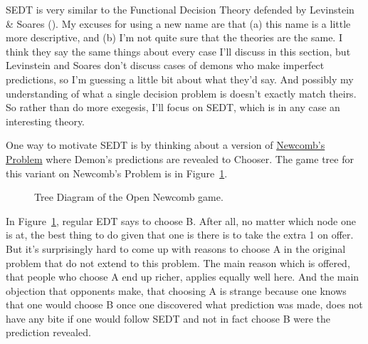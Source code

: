 \documentclass[
  12pt,
  letterpaper,
  DIV=11,
  numbers=noendperiod]{scrreprt}
\begin{document}
SEDT is very similar to the Functional Decision Theory defended by
Levinstein \& Soares (). My
excuses for using a new name are that (a) this name is a little more
descriptive, and (b) I'm not quite sure that the theories are the same.
I think they say the same things about every case I'll discuss in this
section, but Levinstein and Soares don't discuss cases of demons who
make imperfect predictions, so I'm guessing a little bit about what
they'd say. And possibly my understanding of what a single decision
problem is doesn't exactly match theirs. So rather than do more
exegesis, I'll focus on SEDT, which is in any case an interesting
theory.

One way to motivate SEDT is by thinking about a version of
\hyperref[tbl-newcomb]{Newcomb's Problem} where Demon's predictions are
revealed to Chooser. The game tree for this variant on Newcomb's Problem
is in Figure~\ref{fig-open-newcomb}.

\begin{figure}


\caption{\label{fig-open-newcomb}Tree Diagram of the Open Newcomb game.}

\end{figure}%

In Figure~\ref{fig-open-newcomb}, regular EDT says to choose B. After
all, no matter which node one is at, the best thing to do given that one
is there is to take the extra 1 on offer. But it's surprisingly hard to
come up with reasons to choose A in the original problem that do not
extend to this problem. The main reason which is offered, that people
who choose A end up richer, applies equally well here. And the main
objection that opponents make, that choosing A is strange because one
knows that one would choose B once one discovered what prediction was
made, does not have any bite if one would follow SEDT and not in fact
choose B were the prediction revealed.
\end{document}
